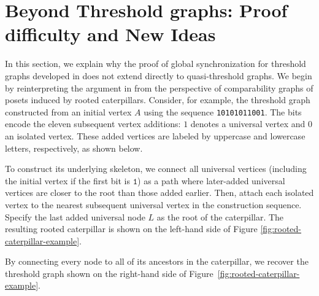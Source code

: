 \documentclass[11pt,reqno]{amsart}
\theoremstyle{definition}
\begin{document}
\section{Beyond Threshold graphs: Proof difficulty and New Ideas}\label{sec:beyond-threshold}
In this section, we explain why the proof of global synchronization for threshold graphs developed in \cite{wu2025threshold} does not extend directly to quasi-threshold graphs.
We begin by reinterpreting the argument in \cite{wu2025threshold} from the perspective of comparability graphs of posets induced by rooted caterpillars.
Consider, for example, the threshold graph constructed
from an initial vertex $A$ using the sequence
\texttt{10101011001}.
The bits encode the eleven subsequent vertex additions:
$1$ denotes a universal vertex and $0$ an isolated vertex.
These added vertices are labeled by uppercase and lowercase
letters, respectively, as shown below.
\begin{center}
\end{center}

To construct its underlying skeleton, we connect all universal vertices (including the initial vertex if the first bit is $\texttt{1}$) as a path where later-added universal vertices are closer to the root than those added earlier. Then, attach each isolated vertex to the nearest subsequent universal vertex in the construction sequence. Specify the last added universal node $L$ as the root of the caterpillar. The resulting rooted caterpillar is shown on the left-hand side of Figure \ref{fig:rooted-caterpillar-example}.

By connecting every node to all of its ancestors in the caterpillar, we recover the threshold graph shown on the right-hand side of Figure~\ref{fig:rooted-caterpillar-example}.
\end{document}
